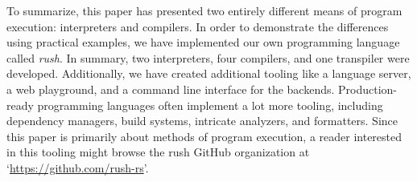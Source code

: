 To summarize, this paper has presented two entirely different means of program execution: interpreters and compilers.
In order to demonstrate the differences using practical examples,
we have implemented our own programming language called \emph{rush}.
In summary, two interpreters, four compilers, and one transpiler were developed.
Additionally, we have created additional tooling like a language server, a web playground, and a command line interface for the backends.
Production-ready programming languages often implement a lot more tooling, including dependency managers, build systems, intricate analyzers, and formatters.
Since this paper is primarily about methods of program execution, a reader interested in this tooling might browse the rush GitHub organization at `\url{https://github.com/rush-rs}'.
